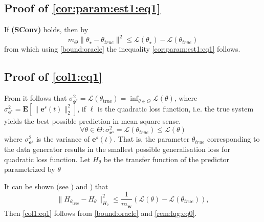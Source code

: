 \documentclass{article}
\newcommand{\e}{\mathbf{e}}
\newcommand{\w}{\mathbf{w}}
\newcommand{\bE}{\mathbf{E}}
\begin{document}
\subsection{Proof of \eqref{cor:param:est1:eq1}}
   If \textbf{(SConv)} holds, then by \cite[Theorem 2.1.11, Theorem 2.1.8]{NesterovBook}
   \[ m_{\Theta} \|\theta_{\star}-\theta_{true}\|^2 \le \mathcal{L}(\theta_{\star}) - \mathcal{L}(\theta_{true}) \]
   from which using \eqref{bound:oracle} the inequality \eqref{cor:param:est1:eq1} follows.

\subsection{Proof of \eqref{col1:eq1}}
From
\cite[Chapter 4, page 87]{LjungBook} 
it follows that 
$\sigma^2_{\e^s}=\mathcal{L}(\theta_{\mathrm{true}})=\inf_{\theta \in \Theta} \mathcal{L}(\theta)$, 
where $\sigma^2_{\e^s}=\bE[\|\e^s(t)\|^2_2]$, 
if $\ell$  is the quadratic loss function, 
i.e. the true system yields the best possible prediction in mean square sense.
\begin{equation}
\label{param_set:true_eq}
 \forall \theta \in \Theta:  \sigma^2_{\e^s}=\mathcal{L}(\theta_{true}) \le \mathcal{L}(\theta) 
\end{equation}
where $\sigma^2_{\e^s}$ is the variance of $\e^s(t)$.
That is, the parameter $\theta_{true}$ corresponding to the data generator results in the smallest possible generalisation loss for quadratic loss function.
Let $H_{\theta}$ be the transfer function of
the predictor parametrized by $\theta$

It can be shown (see \cite[Appendix, (82)]{eringisRenyi}) and \cite[Chapter 4, page 87]{LjungBook}) that
\begin{equation}
\label{rem:lqg:eq0}
\|H_{\theta_{\mathrm{true}}}-H_{\theta} \|_{H_2}^2 \le \frac{1}{m_{\w}} (\mathcal{L}(\theta) - \mathcal{L}(\theta_{true})), %
\end{equation}
Then \eqref{col1:eq1} follows from \eqref{bound:oracle} and \eqref{rem:lqg:eq0}.
\end{document}
